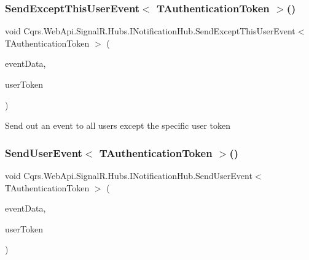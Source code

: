 \subsubsection{\texorpdfstring{Send\+Except\+This\+User\+Event$<$ T\+Authentication\+Token $>$()}{SendExceptThisUserEvent< TAuthenticationToken >()}}
{\footnotesize\ttfamily void Cqrs.\+Web\+Api.\+Signal\+R.\+Hubs.\+I\+Notification\+Hub.\+Send\+Except\+This\+User\+Event$<$ T\+Authentication\+Token $>$ (\begin{DoxyParamCaption}\item[{\hyperlink{interfaceCqrs_1_1Events_1_1IEvent}{I\+Event}$<$ T\+Authentication\+Token $>$}]{event\+Data,  }\item[{string}]{user\+Token }\end{DoxyParamCaption})}



Send out an event to all users except the specific user token 

\mbox{\label{interfaceCqrs_1_1WebApi_1_1SignalR_1_1Hubs_1_1INotificationHub_a88cb05c6807058bfe2bff48427a45ad2_a88cb05c6807058bfe2bff48427a45ad2}} 
\subsubsection{\texorpdfstring{Send\+User\+Event$<$ T\+Authentication\+Token $>$()}{SendUserEvent< TAuthenticationToken >()}}
{\footnotesize\ttfamily void Cqrs.\+Web\+Api.\+Signal\+R.\+Hubs.\+I\+Notification\+Hub.\+Send\+User\+Event$<$ T\+Authentication\+Token $>$ (\begin{DoxyParamCaption}\item[{\hyperlink{interfaceCqrs_1_1Events_1_1IEvent}{I\+Event}$<$ T\+Authentication\+Token $>$}]{event\+Data,  }\item[{string}]{user\+Token }\end{DoxyParamCaption})}



